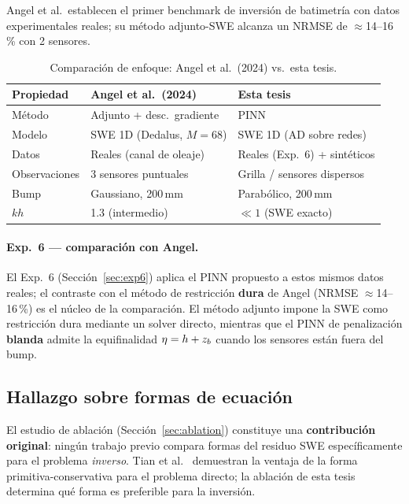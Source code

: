 Angel et al.\ establecen el primer benchmark de inversión de batimetría
con datos experimentales reales; su método adjunto-SWE alcanza un NRMSE de
$\approx$14--16\,\% con 2 sensores.

\begin{table}[H]
\centering
\caption{Comparación de enfoque: Angel et al.\ (2024) vs.\ esta tesis.}
\label{tab:angel-comp}
\begin{tabular}{lll}
\toprule
Propiedad & Angel et al.\ (2024) & Esta tesis \\
\midrule
Método & Adjunto + desc.\ gradiente & PINN \\
Modelo & SWE 1D (Dedalus, $M=68$) & SWE 1D (AD sobre redes) \\
Datos & Reales (canal de oleaje) & Reales (Exp.\ 6) + sintéticos \\
Observaciones & 3 sensores puntuales & Grilla / sensores dispersos \\
Bump & Gaussiano, 200\,mm & Parabólico, 200\,mm \\
$kh$ & 1.3 (intermedio) & $\ll 1$ (SWE exacto) \\
\bottomrule
\end{tabular}
\end{table}

\paragraph{Exp.\ 6 --- comparación con Angel.}
El Exp.~6 (Sección~\ref{sec:exp6}) aplica el PINN propuesto a estos mismos
datos reales; el contraste con el método de restricción \textbf{dura} de
Angel (NRMSE $\approx$14--16\,\%) es el núcleo de la comparación. El método
adjunto impone la SWE como restricción dura mediante un solver directo,
mientras que el PINN de penalización \textbf{blanda} admite la equifinalidad
$\eta = h + z_b$ cuando los sensores están fuera del bump.

\subsection{Hallazgo sobre formas de ecuación}

El estudio de ablación (Sección~\ref{sec:ablation}) constituye una
\textbf{contribución original}: ningún trabajo previo compara formas
del residuo SWE específicamente para el problema \emph{inverso}.
Tian et al.\ \cite{tian2025} demuestran la ventaja de la forma
primitiva-conservativa para el problema directo; la ablación de esta tesis
determina qué forma es preferible para la inversión. 
